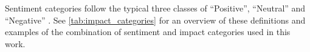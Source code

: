 Sentiment categories follow the typical three classes of ``Positive'', ``Neutral'' and ``Negative'' \citep[e.g.,][]{Liu2012}.
See \autoref{tab:impact_categories} for an overview of these definitions and examples of the combination of sentiment and impact categories used in this work.












